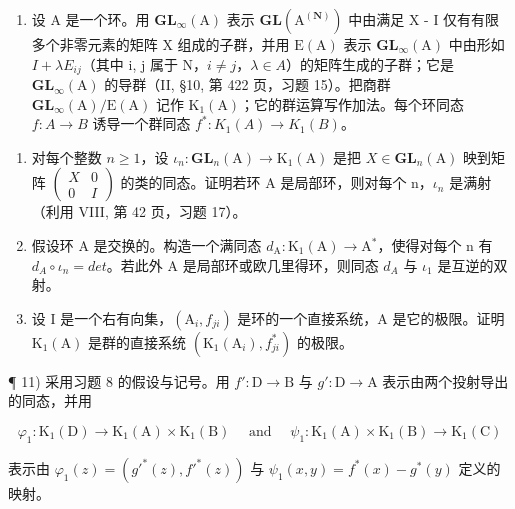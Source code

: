 \begin{enumerate}
\def\labelenumi{\arabic{enumi})}
\setcounter{enumi}{9}
\tightlist
\item
  设 A 是一个环。用 \(\mathbf{GL}_{\infty}(\mathrm{A})\) 表示 \(\mathbf{GL}(\mathrm{A}^{(\mathbf{N})})\) 中由满足 X - I 仅有有限多个非零元素的矩阵 X 组成的子群，并用 \(\mathrm{E}(\mathrm{A})\) 表示 \(\mathbf{GL}_{\infty}(\mathrm{A})\) 中由形如 \(I + \lambda E_{ij}\)（其中 i, j 属于 N，\(i \neq j\)，\(\lambda \in A\)）的矩阵生成的子群；它是 \(\mathbf{GL}_{\infty}(\mathrm{A})\) 的导群（II, §10, 第 422 页，习题 15）。把商群 \(\mathbf{GL}_{\infty}(\mathrm{A}) / \mathrm{E}(\mathrm{A})\) 记作 \(\mathrm{K}_{1}(\mathrm{A})\)；它的群运算写作加法。每个环同态 \(f : A \to B\) 诱导一个群同态 \(f^{*} : K_{1}(A) \to K_{1}(B)\)。
\end{enumerate}

\begin{enumerate}
\def\labelenumi{\alph{enumi})}
\item
  对每个整数 \(n \geqslant 1\)，设 \(\iota_{n} : \mathbf{GL}_{n}(\mathrm{A}) \to \mathrm{K}_{1}(\mathrm{A})\) 是把 \(X \in \mathbf{GL}_{n}(\mathrm{A})\) 映到矩阵 \(\begin{pmatrix} X & 0 \\ 0 & I \end{pmatrix}\) 的类的同态。证明若环 A 是局部环，则对每个 n，\(\iota_{n}\) 是满射（利用 VIII, 第 42 页，习题 17）。
\item
  假设环 A 是交换的。构造一个满同态 \(d_{\mathrm{A}} : \mathrm{K}_{1}(\mathrm{A}) \to \mathrm{A}^{*}\)，使得对每个 n 有 \(d_{A} \circ \iota_{n} = det\)。若此外 A 是局部环或欧几里得环，则同态 \(d_{A}\) 与 \(\iota_{1}\) 是互逆的双射。
\item
  设 I 是一个右有向集，\((\mathrm{A}_{i}, f_{ji})\) 是环的一个直接系统，A 是它的极限。证明 \(\mathrm{K}_{1}(\mathrm{A})\) 是群的直接系统 \((\mathrm{K}_{1}(\mathrm{A}_{i}), f_{ji}^{*})\) 的极限。
\end{enumerate}

¶ 11) 采用习题 8 的假设与记号。用 \(f': \mathrm{D} \to \mathrm{B}\) 与 \(g': \mathrm{D} \to \mathrm{A}\) 表示由两个投射导出的同态，并用

\[
\varphi_ {1}: \mathrm{K} _ {1} (\mathrm{D}) \rightarrow \mathrm{K} _ {1} (\mathrm{A}) \times \mathrm{K} _ {1} (\mathrm{B}) \quad \text { and } \quad \psi_ {1}: \mathrm{K} _ {1} (\mathrm{A}) \times \mathrm{K} _ {1} (\mathrm{B}) \rightarrow \mathrm{K} _ {1} (\mathrm{C})
\]

表示由 \(\varphi_1(z) = (g'^* (z), f'^* (z))\) 与 \(\psi_1(x,y) = f^* (x) - g^* (y)\) 定义的映射。

